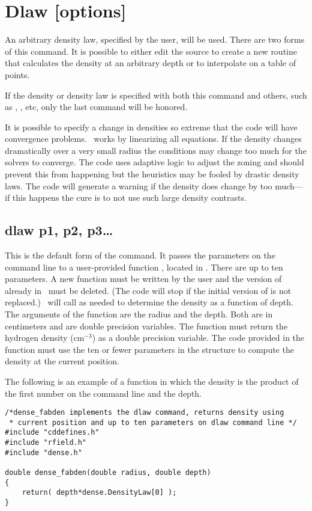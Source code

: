 \section{Dlaw [options]}

An arbitrary density law, specified by the user, will be used.
There are two forms of this command.
It is possible to either edit the source
to create a new routine that calculates the density at an arbitrary depth
or to interpolate on a table of points.

If the density or density law is specified with both this command and
others, such as , , etc,
only the last command will be honored.

It is possible to specify a change in densities so extreme that the code
will have convergence problems.
\Cloudy\ works by linearizing all equations.
If the density changes dramatically over a very small radius the
conditions may change too much for the solvers to converge.  The code uses
adaptive logic to adjust the zoning and should prevent this from happening
but the heuristics may be fooled by drastic density laws.  The code will
generate a warning if the density does change by too much---if
this happens
the cure is to not use such large density contrasts.

\subsection{dlaw p1, p2, p3\dots}

This is the default form of the command.  It passes the parameters on
the command line to a user-provided function  ,
located in .  There are up to ten
parameters.  A new function   must be written
by the user and the
version of  already in \Cloudy\ must be deleted.
(The code will stop
if the initial version of  is not replaced.)
\Cloudy\ will call 
as needed to determine the density as a function of depth.
The arguments
of the function are the radius and the depth.
Both are in centimeters and are double precision variables.
The function must return the hydrogen density (cm$^{-3}$)
as a double precision variable.
The code provided in the function must use the ten or fewer
parameters in the structure 
to compute the density at the current position.

The following is an example of a function in which the density is the
product of the first number on the command line and the depth.
\begin{verbatim}
/*dense_fabden implements the dlaw command, returns density using
 * current position and up to ten parameters on dlaw command line */
#include "cddefines.h"
#include "rfield.h"
#include "dense.h"

double dense_fabden(double radius, double depth)
{
    return( depth*dense.DensityLaw[0] );
}
\end{verbatim}

